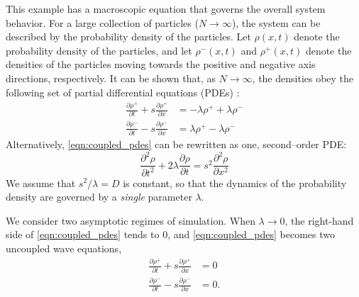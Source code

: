 \documentclass[prl, reprint, final, showkeys]{revtex4-1}
\begin{document}
This example has a macroscopic equation that governs the overall system behavior.
%
For a large collection of particles ($N \rightarrow \infty$), the system can be described by the probability density of the particles.
%
Let $\rho(x, t)$ denote the probability density of the particles, and let $\rho^-(x, t)$ and $\rho^+(x, t)$ denote the densities of the particles moving towards the positive and negative axis directions, respectively.
%
It can be shown that, as $N \rightarrow \infty$, the densities obey the following set of partial differential equations (PDEs) \cite{othmer2000diffusion}:
\begin{equation} \label{eqn:coupled_pdes}
\begin{aligned}
\frac{\partial \rho^+}{\partial t} + s \frac{\partial \rho^+}{\partial x} & = -\lambda \rho^+ +\lambda \rho^- \\
\frac{\partial \rho^-}{\partial t} - s \frac{\partial \rho^-}{\partial x} & = \lambda \rho^+ -\lambda \rho^- 
\end{aligned}
\end{equation}
%
Alternatively, \eqref{eqn:coupled_pdes} can be rewritten as one, second--order PDE:
\begin{equation} \label{eq:second_order_pde}
\frac{\partial^2 \rho}{\partial t^2} + 2 \lambda \frac{\partial \rho}{\partial t} = s^2 \frac{\partial ^2 \rho}{\partial x^2}
\end{equation}
%
We assume that $s^2/\lambda = D$ is constant, so that the dynamics of the probability density are governed by a {\em single} parameter $\lambda$.


We consider two asymptotic regimes of simulation.
%
When $\lambda \rightarrow 0$, the right-hand side of \eqref{eqn:coupled_pdes} tends to 0, and \eqref{eqn:coupled_pdes} becomes two uncoupled wave equations,
\begin{equation}
\begin{aligned}
\frac{\partial \rho^+}{\partial t} + s \frac{\partial \rho^+}{\partial x} & = 0 \\
\frac{\partial \rho^-}{\partial t} - s \frac{\partial \rho^-}{\partial x} & = 0.
\end{aligned}
\end{equation}
\end{document}
